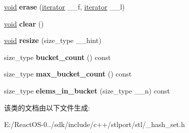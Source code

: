 \begin{DoxyCompactItemize}
\hyperlink{interfacevoid}{void} {\bfseries erase} (\hyperlink{structiterator}{iterator} \+\_\+\+\_\+f, \hyperlink{structiterator}{iterator} \+\_\+\+\_\+l)
\item 
\mbox{\label{classhash__set_a9ce9a7b1ab0437a20a23a89d32e63fd8}} 
\hyperlink{interfacevoid}{void} {\bfseries clear} ()
\item 
\mbox{\label{classhash__set_af6d85ac89f7d6ce04fbc48a5473a6087}} 
\hyperlink{interfacevoid}{void} {\bfseries resize} (size\+\_\+type \+\_\+\+\_\+hint)
\item 
\mbox{\label{classhash__set_aeb7c04b215f6ee0e3329716e8a22e3d1}} 
size\+\_\+type {\bfseries bucket\+\_\+count} () const
\item 
\mbox{\label{classhash__set_adb83e963027ceec84fabbb29d4881265}} 
size\+\_\+type {\bfseries max\+\_\+bucket\+\_\+count} () const
\item 
\mbox{\label{classhash__set_aab44d256abe57979e844ed0dab0985b9}} 
size\+\_\+type {\bfseries elems\+\_\+in\+\_\+bucket} (size\+\_\+type \+\_\+\+\_\+n) const
\end{DoxyCompactItemize}


该类的文档由以下文件生成\+:\begin{DoxyCompactItemize}
\item 
E\+:/\+React\+O\+S-\/0../sdk/include/c++/stlport/stl/\+\_\+hash\+\_\+set.\+h\end{DoxyCompactItemize}
